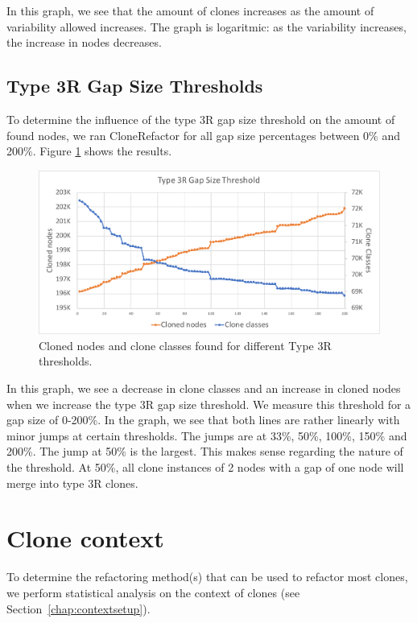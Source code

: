 In this graph, we see that the amount of clones increases as the amount of variability allowed increases. The graph is logaritmic: as the variability increases, the increase in nodes decreases.

\subsection{Type 3R Gap Size Thresholds}
To determine the influence of the type 3R gap size threshold on the amount of found nodes, we ran CloneRefactor for all gap size percentages between 0\% and 200\%. Figure \ref{fig:t3rgraph} shows the results.

\begin{figure}[H]
  \includegraphics[width=1\textwidth]{img/T3R}
  \caption{Cloned nodes and clone classes found for different Type 3R thresholds.}
  \label{fig:t3rgraph}
\end{figure}

In this graph, we see a decrease in clone classes and an increase in cloned nodes when we increase the type 3R gap size threshold. We measure this threshold for a gap size of 0-200\%. In the graph, we see that both lines are rather linearly with minor jumps at certain thresholds. The jumps are at 33\%, 50\%, 100\%, 150\% and 200\%. The jump at 50\% is the largest. This makes sense regarding the nature of the threshold. At 50\%, all clone instances of 2 nodes with a gap of one node will merge into type 3R clones.

\section{Clone context}
To determine the refactoring method(s) that can be used to refactor most clones, we perform statistical analysis on the context of clones (see Section~\ref{chap:contextsetup}).

